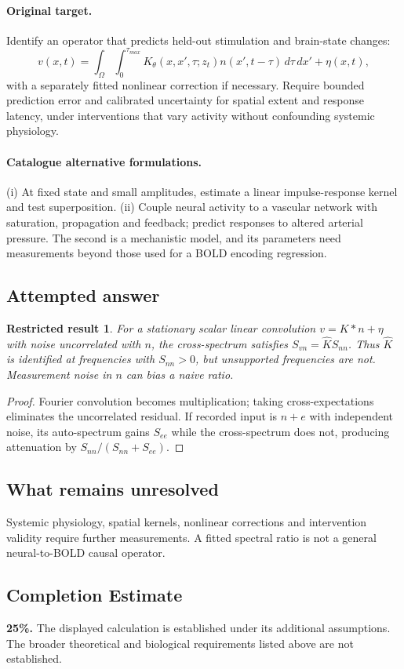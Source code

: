 \documentclass[11pt]{article}
\newtheorem{attemptresult}{Restricted result}[section]
\begin{document}
\paragraph{Original target.}
Identify an operator that predicts held-out stimulation and brain-state changes:
\[
 v(x,t)=\int_\Omega\int_0^{\tau_{max}}K_\theta(x,x',\tau;z_t)n(x',t-\tau)\,d\tau\,dx'+\eta(x,t),
\]
with a separately fitted nonlinear correction if necessary. Require bounded prediction error and calibrated uncertainty for spatial extent and response latency, under interventions that vary activity without confounding systemic physiology.
\paragraph{Catalogue alternative formulations.}
(i) At fixed state and small amplitudes, estimate a linear impulse-response kernel and test superposition. (ii) Couple neural activity to a vascular network with saturation, propagation and feedback; predict responses to altered arterial pressure. The second is a mechanistic model, and its parameters need measurements beyond those used for a BOLD encoding regression.
\subsection{Attempted answer}
\begin{attemptresult}
For a stationary scalar linear convolution $v=K*n+\eta$ with noise uncorrelated with $n$, the cross-spectrum satisfies $S_{vn}=\widehat K S_{nn}$. Thus $\widehat K$ is identified at frequencies with $S_{nn}>0$, but unsupported frequencies are not. Measurement noise in $n$ can bias a naive ratio.
\end{attemptresult}
\begin{proof}
Fourier convolution becomes multiplication; taking cross-expectations eliminates the uncorrelated residual. If recorded input is $n+e$ with independent noise, its auto-spectrum gains $S_{ee}$ while the cross-spectrum does not, producing attenuation by $S_{nn}/(S_{nn}+S_{ee})$.
\end{proof}
\subsection{What remains unresolved}
Systemic physiology, spatial kernels, nonlinear corrections and intervention validity require further measurements. A fitted spectral ratio is not a general neural-to-BOLD causal operator.
\subsection{Completion Estimate}
\textbf{25\%.} The displayed calculation is established under its additional assumptions. The broader theoretical and biological requirements listed above are not established.
\end{document}
